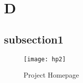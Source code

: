 \clearpage
\section{D}


\subsection{subsection1}
\lipsum[5-7]
\begin{figure}[h]
    \centering
    \texttt{[image: hp2]}
    \caption{Project Homepage}
    \label{fig:project-homepage}
\end{figure}
